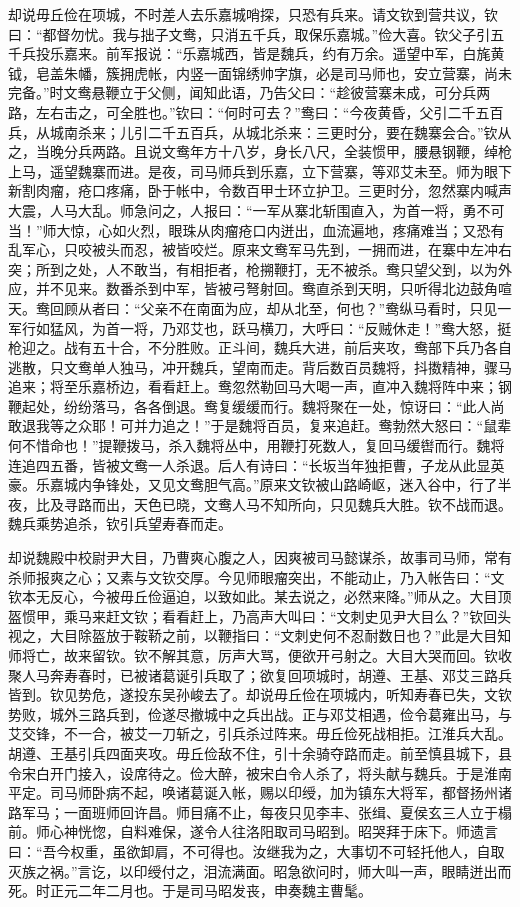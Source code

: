 却说毋丘俭在项城，不时差人去乐嘉城哨探，只恐有兵来。请文钦到营共议，钦曰：“都督勿忧。我与拙子文鸯，只消五千兵，取保乐嘉城。”俭大喜。钦父子引五千兵投乐嘉来。前军报说：“乐嘉城西，皆是魏兵，约有万余。遥望中军，白旄黄钺，皂盖朱幡，簇拥虎帐，内竖一面锦绣帅字旗，必是司马师也，安立营寨，尚未完备。”时文鸯悬鞭立于父侧，闻知此语，乃告父曰：“趁彼营寨未成，可分兵两路，左右击之，可全胜也。”钦曰：“何时可去？”鸯曰：“今夜黄昏，父引二千五百兵，从城南杀来；儿引二千五百兵，从城北杀来：三更时分，要在魏寨会合。”钦从之，当晚分兵两路。且说文鸯年方十八岁，身长八尺，全装惯甲，腰悬钢鞭，绰枪上马，遥望魏寨而进。是夜，司马师兵到乐嘉，立下营寨，等邓艾未至。师为眼下新割肉瘤，疮口疼痛，卧于帐中，令数百甲士环立护卫。三更时分，忽然寨内喊声大震，人马大乱。师急问之，人报曰：“一军从寨北斩围直入，为首一将，勇不可当！”师大惊，心如火烈，眼珠从肉瘤疮口内迸出，血流遍地，疼痛难当；又恐有乱军心，只咬被头而忍，被皆咬烂。原来文鸯军马先到，一拥而进，在寨中左冲右突；所到之处，人不敢当，有相拒者，枪搠鞭打，无不被杀。鸯只望父到，以为外应，并不见来。数番杀到中军，皆被弓弩射回。鸯直杀到天明，只听得北边鼓角喧天。鸯回顾从者曰：“父亲不在南面为应，却从北至，何也？”鸯纵马看时，只见一军行如猛风，为首一将，乃邓艾也，跃马横刀，大呼曰：“反贼休走！”鸯大怒，挺枪迎之。战有五十合，不分胜败。正斗间，魏兵大进，前后夹攻，鸯部下兵乃各自逃散，只文鸯单人独马，冲开魏兵，望南而走。背后数百员魏将，抖擞精神，骤马追来；将至乐嘉桥边，看看赶上。鸯忽然勒回马大喝一声，直冲入魏将阵中来；钢鞭起处，纷纷落马，各各倒退。鸯复缓缓而行。魏将聚在一处，惊讶曰：“此人尚敢退我等之众耶！可并力追之！”于是魏将百员，复来追赶。鸯勃然大怒曰：“鼠辈何不惜命也！”提鞭拨马，杀入魏将丛中，用鞭打死数人，复回马缓辔而行。魏将连追四五番，皆被文鸯一人杀退。后人有诗曰：“长坂当年独拒曹，子龙从此显英豪。乐嘉城内争锋处，又见文鸯胆气高。”原来文钦被山路崎岖，迷入谷中，行了半夜，比及寻路而出，天色已晓，文鸯人马不知所向，只见魏兵大胜。钦不战而退。魏兵乘势追杀，钦引兵望寿春而走。

却说魏殿中校尉尹大目，乃曹爽心腹之人，因爽被司马懿谋杀，故事司马师，常有杀师报爽之心；又素与文钦交厚。今见师眼瘤突出，不能动止，乃入帐告曰：“文钦本无反心，今被毋丘俭逼迫，以致如此。某去说之，必然来降。”师从之。大目顶盔惯甲，乘马来赶文钦；看看赶上，乃高声大叫曰：“文刺史见尹大目么？”钦回头视之，大目除盔放于鞍鞒之前，以鞭指曰：“文刺史何不忍耐数日也？”此是大目知师将亡，故来留钦。钦不解其意，厉声大骂，便欲开弓射之。大目大哭而回。钦收聚人马奔寿春时，已被诸葛诞引兵取了；欲复回项城时，胡遵、王基、邓艾三路兵皆到。钦见势危，遂投东吴孙峻去了。却说毋丘俭在项城内，听知寿春已失，文钦势败，城外三路兵到，俭遂尽撤城中之兵出战。正与邓艾相遇，俭令葛雍出马，与艾交锋，不一合，被艾一刀斩之，引兵杀过阵来。毋丘俭死战相拒。江淮兵大乱。胡遵、王基引兵四面夹攻。毋丘俭敌不住，引十余骑夺路而走。前至慎县城下，县令宋白开门接入，设席待之。俭大醉，被宋白令人杀了，将头献与魏兵。于是淮南平定。司马师卧病不起，唤诸葛诞入帐，赐以印绶，加为镇东大将军，都督扬州诸路军马；一面班师回许昌。师目痛不止，每夜只见李丰、张缉、夏侯玄三人立于榻前。师心神恍惚，自料难保，遂令人往洛阳取司马昭到。昭哭拜于床下。师遗言曰：“吾今权重，虽欲卸肩，不可得也。汝继我为之，大事切不可轻托他人，自取灭族之祸。”言讫，以印绶付之，泪流满面。昭急欲问时，师大叫一声，眼睛迸出而死。时正元二年二月也。于是司马昭发丧，申奏魏主曹髦。

